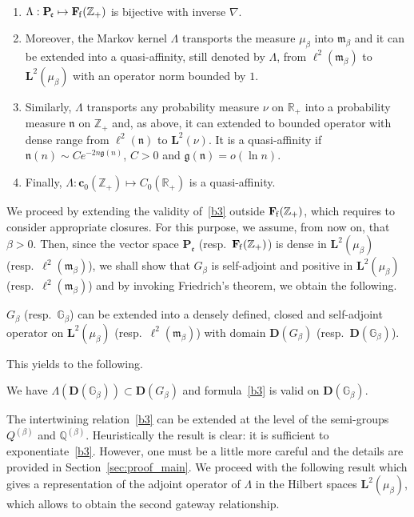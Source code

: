 \documentclass[AHL,Unicode,longabstracts]{cedram}
\newcommand{\RR}{\mathbb{R}}
\newcommand{\ZZ}{\mathbb{Z}}
\newcommand{\fe}{\mathfrak{e}}
\newcommand{\fm}{\mathfrak{m}}
\newcommand{\na}{\nabla}
\newcommand{\dBg}{{\discret{G}}}
\newcommand{\Bg}{G}
\newcommand{\dBs}{{\discret{Q}}}
\newcommand{\Bs}{Q}
\newcommand{\esP}{\mathbf{P}}
\newcommand{\esD}{\mathbf{D}}
\newcommand{\esL}{\mathbf{L}}
\newcommand{\esLd}{\ell}
\newcommand{\esF}{\mathbf{F}}
\newcommand{\esc}{\mathbf{c}}
\newcommand{\esPe}{\esP_{\! \fe}}
\newcommand{\esFf}{\esF_{\hskip-.3mm\mathrm{f}}}
\newcommand{\Cp}{{C_{0}(\RR_{+})}}
\newcommand{\discret}[1]{\mathds{#1}}
\newenvironment{lemmc}{\let\pointir\relax \begin{lemm}}{\end{lemm}}
\begin{document}
\begin{lemmc}\label{lem:lambda_def}\ 
\begin{enumerate}%
\item $\Lambda : \esPe \mapsto \esFf(\ZZ_+)$ is bijective with inverse $\na$.
\item Moreover, the Markov kernel $\Lambda$ transports the measure $\mu_{\beta}$ into $\fm_{\beta}$ and it can be extended into a quasi-affinity, still denoted by $\Lambda$, from $\esLd^2(\fm_{\beta})$ to $\esL^2(\mu_{\beta})$ with an operator norm bounded by $1$.
\item Similarly, $\Lambda$ transports any probability measure $\nu$ on $\RR_+$ into a probability measure $\mathfrak{n}$ on $\ZZ_+$ and, as above, it can extended to bounded operator with dense range from $\esLd^2(\mathfrak{n})$ to $\esL^2(\nu)$. It is a quasi-affinity if $\mathfrak{n}(n)\sim C e^{-2 n \mathfrak{g}(n)}$, $C>0$ and $\mathfrak{g(n)}=o(\ln n)$.
\item Finally, $\Lambda : \esc_0(\ZZ_+) \mapsto \Cp$ is a quasi-affinity.
\end{enumerate}
\end{lemmc}

We proceed by extending the validity of~\eqref{b3} outside $\esFf(\ZZ_+)$, which requires to consider appropriate closures. For this purpose, we assume, from now on, that $\beta>0$. Then, since the vector space $\esPe$ (resp.~$\esFf(\ZZ_+)$) is dense in $\esL^2(\mu_{\beta})$ (resp.~$\esLd^2(\fm_{\beta})$), we shall show that $\Bg_{\beta}$ is self-adjoint and positive in $\esL^2(\mu_{\beta})$ (resp.~$\esLd^2(\fm_{\beta})$) and by invoking Friedrich's theorem, we obtain the following.

\begin{lemm}\label{lem:G_L2}
$\Bg_{\beta}$ (resp.~$\dBg_{\beta}$) can be extended into a densely defined, closed and self-adjoint operator on $\esL^2(\mu_{\beta})$ (resp.~$\esLd^2(\fm_{\beta})$) with domain $\esD(\Bg_{\beta})$ (resp.~$\esD(\dBg_{\beta})$).
\end{lemm}

This yields to the following.

\begin{lemm} \label{lem:lambda_range}
We have $\Lambda(\esD(\dBg_{\beta}))\subset \esD(\Bg_{\beta})$ and formula~\eqref{b3} is valid on $\esD(\dBg_{\beta})$.
\end{lemm}

The intertwining relation~\eqref{b3} can be extended at the level of the semi-groups $\Bs^{(\beta)}$ and $\dBs^{(\beta)}$. Heuristically the result is clear: it is sufficient to exponentiate~\eqref{b3}. However, one must be a little more careful and the details are provided in Section~\ref{sec:proof_main}. We proceed with the following result which gives a representation of the adjoint operator of $\Lambda$ in the Hilbert spaces $\esL^2(\mu_{\beta})$, which allows to obtain the second gateway relationship.
\end{document}
